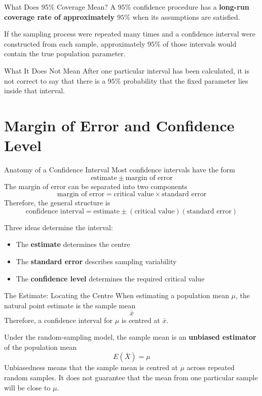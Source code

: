 \documentclass[aspectratio=169]{beamer}
\begin{document}
\begin{frame}{What Does 95\% Coverage Mean?}
A $95\%$ confidence procedure has a \textbf{long-run coverage rate of approximately $95\%$} when its assumptions are satisfied.

\vspace{0.2cm}
If the sampling process were repeated many times and a confidence interval were constructed from each sample, approximately $95\%$ of those intervals would contain the true population parameter.

\vspace{0.2cm}
\begin{alertblock}{What It Does Not Mean}
After one particular interval has been calculated, it is not correct to say that there is a $95\%$ probability that the fixed parameter lies inside that interval.
\end{alertblock}
\end{frame}

\section{Margin of Error and Confidence Level}

\begin{frame}{Anatomy of a Confidence Interval}
Most confidence intervals have the form
$$\text{estimate}\ \pm\ \text{margin of error}$$
The margin of error can be separated into two components
$$\text{margin of error}=\text{critical value}\times\text{standard error}$$
Therefore, the general structure is
$$\boxed{\text{confidence interval}=\text{estimate}\pm(\text{critical value})(\text{standard error})}$$

Three ideas determine the interval:
\begin{itemize}
	\item The \textbf{estimate} determines the centre
  	\item The \textbf{standard error} describes sampling variability
 	\item The \textbf{confidence level} determines the required critical value
\end{itemize}
\end{frame}

\begin{frame}{The Estimate: Locating the Centre}
When estimating a population mean $\mu$, the natural point estimate is the sample mean
$$\bar{x}$$
Therefore, a confidence interval for $\mu$ is centred at $\bar{x}$.

\vspace{0.2cm}
Under the random-sampling model, the sample mean is an \textbf{unbiased estimator} of the population mean
$$E(\bar{X})=\mu$$
Unbiasedness means that the sample mean is centred at $\mu$ across repeated random samples. It does not guarantee that the mean from one particular sample will be close to $\mu$.
\end{frame}
\end{document}
